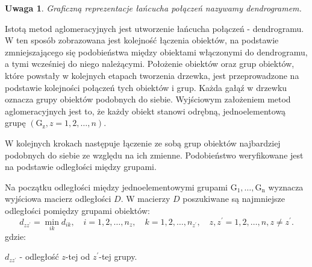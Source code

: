 \documentclass[12pt,a4paper]{report}
\newtheorem{uwaga}{Uwaga}
\begin{document}
\begin{uwaga}
Graficzną reprezentacje łańcucha połączeń nazywamy dendrogramem. 
\end{uwaga}
Istotą metod aglomeracyjnych jest utworzenie łańcucha połączeń - dendrogramu. W ten sposób zobrazowana jest kolejność łączenia obiektów, na podstawie zmniejszającego się podobieństwa między obiektami włączonymi do dendrogramu, a tymi wcześniej do niego należącymi. Położenie obiektów oraz grup obiektów, które powstały w kolejnych etapach tworzenia drzewka, jest przeprowadzone na podstawie kolejności połączeń tych obiektów i grup. Każda gałąź w drzewku oznacza grupy obiektów podobnych do siebie. 
Wyjściowym założeniem metod aglomeracyjnych jest to, że każdy obiekt stanowi odrębną, jednoelementową grupę $(\mathrm{G_{z}}, z=1,2,\dots,n)$.

W kolejnych krokach następuje łączenie ze sobą grup obiektów najbardziej podobnych do siebie ze względu na ich zmienne. Podobieństwo weryfikowane jest na podstawie odległości między grupami.  %

Na początku odległości między jednoelementowymi grupami $\mathrm{G_{1}},\dots,\mathrm{G_{n}}$ wyznacza wyjściowa macierz odległości $D$. W macierzy $D$ poszukiwane są najmniejsze odległości pomiędzy grupami obiektów:
$$
d_{zz^{'}}= \min\limits_{ik} {d_{ik}}, \quad i=1,2,\dots,n_{z}, \quad k=1,2,\dots,n_{z^{'}}, \quad z,z^{'}=1,2,\dots,n, z\neq z^{'}.
$$
gdzie:

$d_{zz^{'}}$ - odległość $z$-tej od $z^{'}$-tej grupy.
\end{document}
